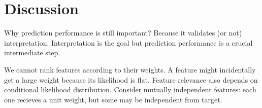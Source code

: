 \documentclass[english]{scrartcl}
\begin{document}







\section{Discussion}
\label{sec:discussion}

{\color{red} Why prediction performance is still important? Because it validates (or not) interpretation. Interpretation is the goal but prediction performance is a crucial intermediate step.}

{\color{red} We cannot rank features according to their weights. A feature might incidentally get a large weight because its likelihood is flat. Feature relevance also depends on conditional likelihood distribution. Consider mutually independent features: each one recieves a unit weight, but some may be independent from target.}
\end{document}
